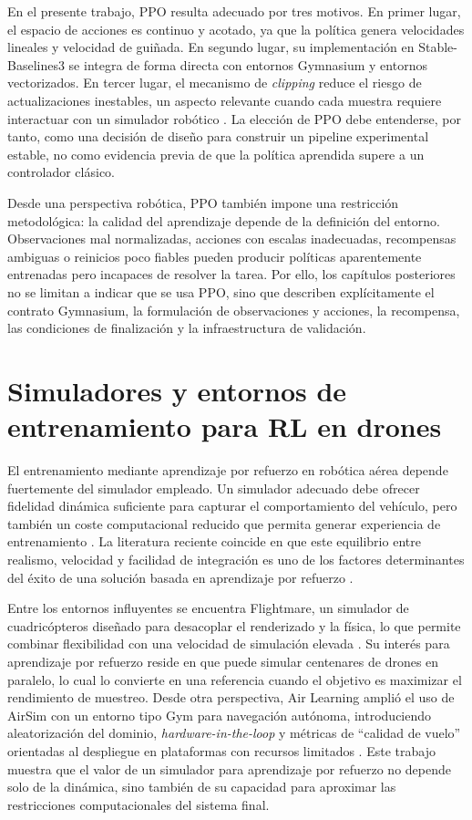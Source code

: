 En el presente trabajo, PPO resulta adecuado por tres motivos. En primer lugar, el
espacio de acciones es continuo y acotado, ya que la política genera velocidades
lineales y velocidad de guiñada. En segundo lugar, su implementación en
Stable-Baselines3 se integra de forma directa con entornos Gymnasium y entornos
vectorizados. En tercer lugar, el mecanismo de \emph{clipping} reduce el riesgo de
actualizaciones inestables, un aspecto relevante cuando cada muestra requiere
interactuar con un simulador robótico \cite{stablebaselines3_ppo}. La elección de
PPO debe entenderse, por tanto, como una decisión de diseño para construir un
pipeline experimental estable, no como evidencia previa de que la política aprendida
supere a un controlador clásico.

Desde una perspectiva robótica, PPO también impone una restricción metodológica:
la calidad del aprendizaje depende de la definición del entorno. Observaciones mal
normalizadas, acciones con escalas inadecuadas, recompensas ambiguas o reinicios
poco fiables pueden producir políticas aparentemente entrenadas pero incapaces de
resolver la tarea. Por ello, los capítulos posteriores no se limitan a indicar que se
usa PPO, sino que describen explícitamente el contrato Gymnasium, la formulación de
observaciones y acciones, la recompensa, las condiciones de finalización y la
infraestructura de validación.

\section{Simuladores y entornos de entrenamiento para RL en drones}

El entrenamiento mediante aprendizaje por refuerzo en robótica aérea depende
fuertemente del simulador empleado. Un simulador adecuado debe ofrecer fidelidad
dinámica suficiente para capturar el comportamiento del vehículo, pero también un
coste computacional reducido que permita generar experiencia de entrenamiento
\cite{chan2024drone_simulators}. La literatura reciente coincide en que este
equilibrio entre realismo, velocidad y facilidad de integración es uno de los
factores determinantes del éxito de una solución basada en aprendizaje por
refuerzo \cite{azar2021drone_review, chan2024drone_simulators}.

Entre los entornos influyentes se encuentra Flightmare, un simulador de
cuadricópteros diseñado para desacoplar el renderizado y la física, lo que
permite combinar flexibilidad con una velocidad de simulación elevada
\cite{song2021flightmare}. Su interés para aprendizaje por refuerzo reside en
que puede simular centenares de drones en paralelo, lo cual lo convierte en una
referencia cuando el objetivo es maximizar el rendimiento de muestreo. Desde
otra perspectiva, Air Learning amplió el uso de AirSim con un entorno tipo Gym
para navegación autónoma, introduciendo aleatorización del dominio,
\emph{hardware-in-the-loop} y métricas de ``calidad de vuelo'' orientadas al
despliegue en plataformas con recursos limitados \cite{krishnan2021airlearning}.
Este trabajo muestra que el valor de un simulador para aprendizaje por refuerzo
no depende solo de la dinámica, sino también de su capacidad para aproximar las
restricciones computacionales del sistema final.

